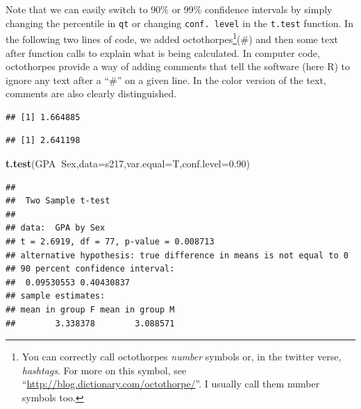 \documentclass[]{book}
\newenvironment{Shaded}{\begin{snugshade}}{\end{snugshade}}
\newcommand{\KeywordTok}[1]{\textcolor[rgb]{0.13,0.29,0.53}{\textbf{#1}}}
\newcommand{\DataTypeTok}[1]{\textcolor[rgb]{0.13,0.29,0.53}{#1}}
\newcommand{\DecValTok}[1]{\textcolor[rgb]{0.00,0.00,0.81}{#1}}
\newcommand{\FloatTok}[1]{\textcolor[rgb]{0.00,0.00,0.81}{#1}}
\newcommand{\CommentTok}[1]{\textcolor[rgb]{0.56,0.35,0.01}{\textit{#1}}}
\newcommand{\OperatorTok}[1]{\textcolor[rgb]{0.81,0.36,0.00}{\textbf{#1}}}
\newcommand{\NormalTok}[1]{#1}
\let\rmarkdownfootnote\footnote%
\def\footnote{\protect\rmarkdownfootnote}
\begin{document}
Note that we can easily switch to 90\% or 99\% confidence intervals by
simply changing the percentile in \texttt{qt} or changing
\texttt{conf.\ level} in the \texttt{t.test} function. In the following
two lines of code, we added octothorpes\footnote{You can correctly call
  octothorpes \emph{number} symbols or, in the twitter verse,
  \emph{hashtags}. For more on this symbol, see
  ``\url{http://blog.dictionary.com/octothorpe/}''. I usually call them
  number symbols too.}(\#) and then some text after function calls to
explain what is being calculated. In computer code, octothorpes provide
a way of adding comments that tell the software (here R) to ignore any
text after a ``\#'' on a given line. In the color version of the text,
comments are also clearly distinguished.

\begin{Shaded}
\end{Shaded}

\begin{verbatim}
## [1] 1.664885
\end{verbatim}

\begin{Shaded}
\end{Shaded}

\begin{verbatim}
## [1] 2.641198
\end{verbatim}

\begin{Shaded}
\begin{Highlighting}[]
\KeywordTok{t.test}\NormalTok{(GPA}\OperatorTok{~}\NormalTok{Sex,}\DataTypeTok{data=}\NormalTok{s217,}\DataTypeTok{var.equal=}\NormalTok{T,}\DataTypeTok{conf.level=}\FloatTok{0.90}\NormalTok{)}
\end{Highlighting}
\end{Shaded}

\begin{verbatim}
## 
##  Two Sample t-test
## 
## data:  GPA by Sex
## t = 2.6919, df = 77, p-value = 0.008713
## alternative hypothesis: true difference in means is not equal to 0
## 90 percent confidence interval:
##  0.09530553 0.40430837
## sample estimates:
## mean in group F mean in group M 
##        3.338378        3.088571
\end{verbatim}
\end{document}

